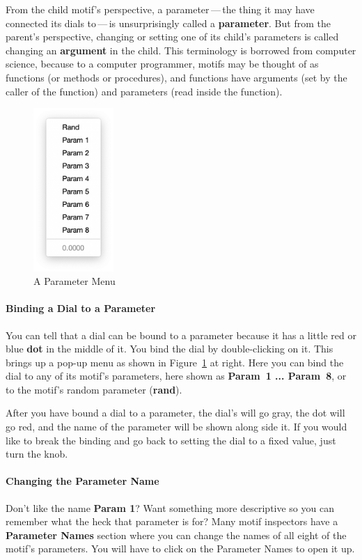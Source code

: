 \documentclass[twoside,10pt]{article}
\begin{document}
From the child motif's perspective, a parameter\,---\,the thing it may have connected its dials to\,---\,is unsurprisingly called a {\bf parameter}.  But from the parent's perspective, changing or setting one of its child's parameters is called changing an {\bf argument} in the child.  This terminology is borrowed from computer science, because to a computer programmer, motifs may be thought of as functions (or methods or procedures), and functions have arguments (set by the caller of the function) and parameters (read inside the function).


\begin{figure}
\vspace{-4em}
\includegraphics[width=1.2in]{params}
\vspace{-1em}
\caption{A Parameter Menu}
\label{params}
\vspace{-3em}
\end{figure}


\paragraph{Binding a Dial to a Parameter} You can tell that a dial can be bound to a parameter because it has a little red or blue {\bf dot} in the middle of it.  You bind the dial by double-clicking on it.  This brings up a pop-up menu as shown in Figure~\ref{params} at right.  Here you can bind the dial to any of its motif's parameters, here shown as {\bf Param~1 ... Param~8}, or to the motif's random parameter ({\bf rand}).

After you have bound a dial to a parameter, the dial's will go gray, the dot will go red, and the name of the parameter will be shown along side it. If you would like to break the binding and go back to setting the dial to a fixed value, just turn the knob. 

\paragraph{Changing the Parameter Name} Don't like the name {\bf Param 1}?  Want something more descriptive so you can remember what the heck that parameter is for?  Many motif inspectors have a {\bf Parameter Names} section where you can change the names of all eight of the motif's parameters.  You will have to click on the Parameter Names to open it up.
\end{document}
